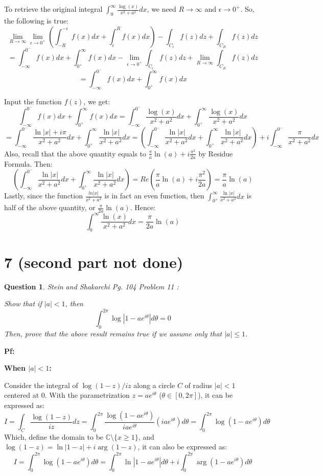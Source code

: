 \documentclass{article}
\newtheorem{question}{Question}
\begin{document}
To retrieve the original integral $\int_{0}^{\infty}\frac{\log(x)}{x^2+a^2}dx$, we need $R\rightarrow\infty$ and $\epsilon\rightarrow 0^+$. So, the following is true:
$$\lim_{R\rightarrow\infty}\lim_{\epsilon\rightarrow 0^+}\left(\int_{-R}^{-\epsilon}f(x)dx+\int_{\epsilon}^{R}f(x)dx\right) - \int_{C_\epsilon}f(z)dz + \int_{C_R}f(z)dz$$
$$ = \int_{-\infty}^{0^-}f(x)dx + \int_{0^+}^{\infty}f(x)dx - \lim_{\epsilon\rightarrow 0^+}\int_{C_\epsilon}f(z)dz + \lim_{R\rightarrow\infty}\int_{C_R}f(z)dz$$
$$ = \int_{-\infty}^{0^-}f(x)dx + \int_{0^+}^{\infty}f(x)dx$$

Input the function $f(z)$, we get:
$$\int_{-\infty}^{0^-}f(x)dx + \int_{0^+}^{\infty}f(x)dx = \int_{-\infty}^{0^-}\frac{\log(x)}{x^2+a^2}dx + \int_{0^+}^{\infty}\frac{\log(x)}{x^2+a^2}dx$$
$$=\int_{-\infty}^{0^-}\frac{\ln|x|+i\pi}{x^2+a^2}dx + \int_{0^+}^{\infty}\frac{\ln|x|}{x^2+a^2}dx = \left(\int_{-\infty}^{0^-}\frac{\ln|x|}{x^2+a^2}dx + \int_{0^+}^{\infty}\frac{\ln|x|}{x^2+a^2}dx\right)+i\int_{-\infty}^{0^-}\frac{\pi}{x^2+a^2}dx$$
Also, recall that the above quantity equals to $\frac{\pi}{a}\ln(a)+i\frac{\pi^2}{2a}$ by Residue Formula. Then:
$$\left(\int_{-\infty}^{0^-}\frac{\ln|x|}{x^2+a^2}dx + \int_{0^+}^{\infty}\frac{\ln|x|}{x^2+a^2}dx\right) = Re\left(\frac{\pi}{a}\ln(a)+i\frac{\pi^2}{2a}\right) = \frac{\pi}{a}\ln(a)$$
Lastly, since the function $\frac{ln|x|}{x^2+a^2}$ is in fact an even function, then $\int_{0^+}^{\infty}\frac{\ln|x|}{x^2+a^2}dx$ is half of the above quantity, or $\frac{\pi}{2a}\ln(a)$.
Hence:
$$\int_{0}^{\infty}\frac{\ln(x)}{x^2+a^2}dx = \frac{\pi}{2a}\ln(a)$$

\break

\section*{7 (second part not done)}
\begin{myBox}[]{}
    \begin{question} Stein and Shakarchi Pg. 104 Problem 11
        :

        Show that if $|a|<1$, then
        $$\int_{0}^{2\pi}\log|1-ae^{i\theta}|d\theta =0$$
        Then, prove that the above result remains true if we assume only that $|a|\leq 1$.
    \end{question}
\end{myBox}

\textbf{Pf:}

\textbf{When $|a|<1$:}

Consider the integral of $\log(1-z)/iz$ along a circle $C$ of radius $|a|<1$ centered at $0$. With the parametrization $z=ae^{i\theta}$ ($\theta\in [0,2\pi]$), it can be expressed as:
$$I=\int_{C}\frac{\log(1-z)}{iz}dz = \int_{0}^{2\pi}\frac{\log(1-ae^{i\theta})}{iae^{i\theta}}(iae^{i\theta})d\theta = \int_{0}^{2\pi}\log(1-ae^{i\theta})d\theta$$
Which, define the domain to be $\mathbb{C}\setminus\{x\geq 1\}$, and $\log(1-z)=\ln|1-z|+i\arg(1-z)$, it can also be expressed as:
$$I= \int_{0}^{2\pi}\log(1-ae^{i\theta})d\theta=\int_{0}^{2\pi}\ln|1-ae^{i\theta}|d\theta + i\int_{0}^{2\pi}\arg(1-ae^{i\theta})d\theta$$
\end{document}
